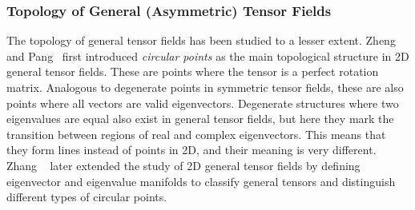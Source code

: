 \subsubsection{Topology of General (Asymmetric) Tensor Fields} %
%
The topology of general tensor fields has been studied to a lesser extent.
%
Zheng and Pang~\cite{Zheng2005a} first introduced \emph{circular points} as the
main topological structure in \ac{2D} general tensor fields.
%
These are points where the tensor is a perfect rotation matrix.
%
Analogous to degenerate points in symmetric tensor fields, these are also points
where all vectors are valid eigenvectors.
%
Degenerate structures where two eigenvalues are equal also exist in general
tensor fields, but here they mark the transition between regions of real and
complex eigenvectors.
%
This means that they form lines instead of points in \ac{2D}, and their meaning
is very different.
%
Zhang \etal~\cite{Zhang2009} later extended the study of \ac{2D} general tensor
fields by defining eigenvector and eigenvalue manifolds to classify general
tensors and distinguish different types of circular points.
%
%
%
